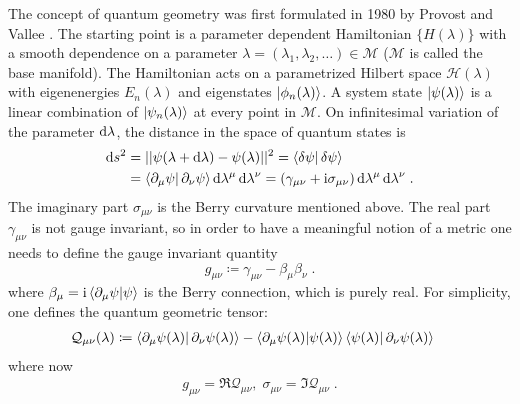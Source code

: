 \documentclass[../main.tex]{subfiles}
\begin{document}
The concept of quantum geometry was first formulated in 1980 by Provost and Vallee \cite{provostRiemannianStructureManifolds1980}.
The starting point is a parameter dependent Hamiltonian \(\{H(\lambda)\}\) with a smooth dependence on a parameter \(\lambda = (\lambda_1, \lambda_2, \ldots) \in \mathcal{M}\) (\(\mathcal{M}\) is called the base manifold).
The Hamiltonian acts on a parametrized Hilbert space \(\mathcal{H} (\lambda)\) with eigenenergies \(E_n (\lambda)\) and eigenstates \(\ket{\phi_n (\lambda)}\).
A system state \(\ket{\psi (\lambda)}\) is a linear combination of \(\ket{\psi_n (\lambda)}\) at every point in \(\mathcal{M}\).
On infinitesimal variation of the parameter \(\odif{\lambda}\), the distance in the space of quantum states is
\begin{align}
	\odif{s^2} &= \vert\vert \psi (\lambda + \odif{\lambda}) - \psi (\lambda) \vert \vert^2 = \braket{\fdif{\psi} | \fdif{\psi}} \\
	&= \braket{\pdif{\mu} \psi | \pdif{\nu} \psi} \odif{\lambda^{\mu}} \odif{\lambda^{\nu}} = (\gamma_{\mu \nu} + \iu \sigma_{\mu \nu}) \odif{\lambda^{\mu}} \odif{\lambda^{\nu}} \;.
\end{align}
The imaginary part \(\sigma_{\mu \nu}\) is the Berry curvature mentioned above.
The real part \(\gamma_{\mu \nu}\) is not gauge invariant, so in order to have a meaningful notion of a metric one needs to define the gauge invariant quantity
\begin{equation}
	g_{\mu \nu} \coloneq \gamma_{\mu \nu} - \beta_{\mu} \beta_{\nu} \;.
\end{equation}
where \(\beta_{\mu} = \iu \braket{\pdif{\mu} \psi | \psi}\) is the Berry connection, which is purely real.
For simplicity, one defines the quantum geometric tensor:
\begin{align}
	\mathcal{Q}_{\mu \nu} (\lambda) &\coloneq \braket{\pdif{\mu} \psi (\lambda) | \pdif{\nu} \psi (\lambda)} - \braket{\pdif{\mu} \psi (\lambda) | \psi (\lambda)} \braket{\psi (\lambda) | \pdif{\nu} \psi (\lambda)}
\end{align}
where now
\begin{align}
	g_{\mu \nu} = \Re \mathcal{Q}_{\mu \nu},\;\sigma_{\mu \nu} = \Im \mathcal{Q}_{\mu \nu} \;.
\end{align}
\end{document}
